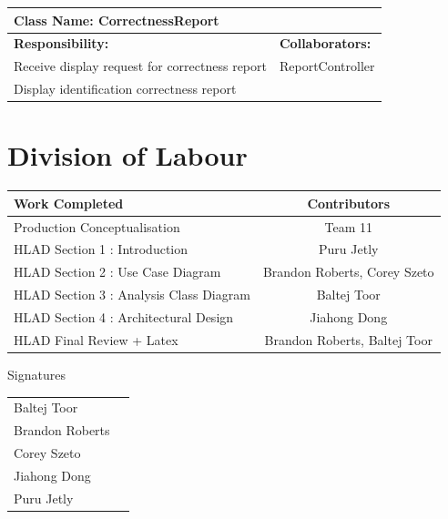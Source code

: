 \documentclass[]{article}
\begin{document}
\newpage
	\begin{table}[ht]
		\centering
		\begin{tabular}{|p{5cm}|p{5cm}|}
		\hline 
		 \multicolumn{2}{|l|}{\textbf{Class Name: CorrectnessReport}} \\
		\hline
		\textbf{Responsibility:} & \textbf{Collaborators:} \\
		\hline
		Receive display request for correctness report & ReportController \\
		\hline
		Display identification correctness report &  \\
		\hline
		\end{tabular}
	\end{table}
	
\newpage
\newpage
\appendix
\section{Division of Labour}
\label{sec:division_of_labour}
\begin{center}
\large
			\begin{tabular}{l|c}
				Work Completed   & Contributors \\\hline
				Production Conceptualisation &Team 11 \\
				HLAD Section 1 : Introduction & Puru Jetly \\
				HLAD Section 2 : Use Case Diagram  & Brandon Roberts, Corey Szeto \\
				HLAD Section 3 : Analysis Class Diagram  & Baltej Toor  \\
				HLAD Section 4 : Architectural Design  & Jiahong Dong \\
				HLAD Final Review + Latex  & Brandon Roberts, Baltej Toor \\
			\end{tabular}
			\vspace{0.1in}
\huge Signatures
\end{center}
			\vspace{0.3in}
\large
			\begin{tabular}{l|r}
			\vspace{1in}
				Baltej Toor  & \underline{\hspace{8cm}} \\
			\vspace{1in}
				Brandon Roberts   & \underline{\hspace{8cm}} \\
			\vspace{1in}
				Corey Szeto  & \underline{\hspace{8cm}} \\
			\vspace{1in}
				Jiahong Dong   & \underline{\hspace{8cm}} \\
			\vspace{1in}
				Puru Jetly   & \underline{\hspace{8cm}} \\
			\end{tabular}
\end{document}
